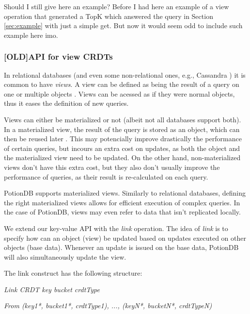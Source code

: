 \documentclass{vldb}
\newcommand{\grumbler}[2]{{\color{red}{\bf #1:} #2}}
\newcommand{\andre}[1]{\grumbler{andre}{#1}}
\newcommand{\emphvspace}{0.5\baselineskip}
\newcommand{\firstblockemph}[1]{\vspace{\emphvspace}\hspace{2em}\emph{#1}}
\newcommand{\middleblockemph}[1]{\hspace{2em}\emph{#1}}
\begin{document}
\andre{Should I still give here an example? Before I had here an example of a view operation that generated a TopK which answered the query in Section \ref{sec:example} with just a simple get. But now it would seem odd to include such example here imo.}

\subsubsection{[OLD]API for view CRDTs}

In relational databases (and even some non-relational ones, e.g., Cassandra \cite{???}) it is common to have \emph{views}. 
A view can be defined as being the result of a query on one or multiple objects \cite{???}.
Views can be acessed as if they were normal objects, thus it eases the definition of new queries.

Views can either be materialized or not (albeit not all databases support both). %
In a materialized view, the result of the query is stored as an object, which can then be reused later \cite{???}.
This may potencially improve drastically the performance of certain queries, but incours an extra cost on updates, as both the object and the materialized view need to be updated.
On the other hand, non-materialized views don't have this extra cost, but they also don't usually improve the performance of queries, as their result is re-calculated on each query.

PotionDB supports materialized views.
Similarly to relational databases, defining the right materialized views allows for efficient execution of complex queries.
In the case of PotionDB, views may even refer to data that isn't replicated locally.

We extend our key-value API with the \emph{link} operation.
The idea of \emph{link} is to specify how can an object (view) be updated based on updates executed on other objects (base data).
Whenever an update is issued on the base data, PotionDB will also simultaneously update the view.

The link construct has the following structure:

\firstblockemph{Link CRDT key bucket crdtType}

\middleblockemph{From (key1*, bucket1*, crdtType1), ..., (keyN*, bucketN*, crdtTypeN)}
\end{document}

